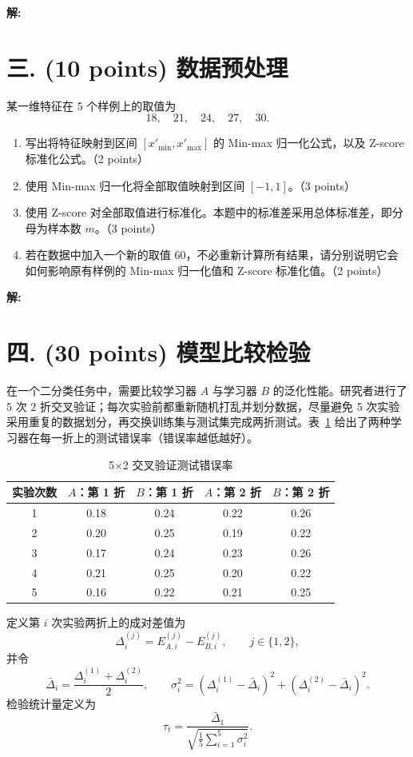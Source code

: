 \documentclass[8pt]{article}
\begin{document}
\textbf{\large 解:}


\clearpage
\section*{三. (10 points) 数据预处理}

某一维特征在 5 个样例上的取值为
\[
18,\quad 21,\quad 24,\quad 27,\quad 30.
\]

\begin{enumerate}[leftmargin=2.2em,itemsep=0.55em]
  \item 写出将特征映射到区间 $[x'_{\min},x'_{\max}]$ 的 Min-max 归一化公式，以及 Z-score 标准化公式。（2 points）
  \item 使用 Min-max 归一化将全部取值映射到区间 $[-1,1]$。（3 points）
  \item 使用 Z-score 对全部取值进行标准化。本题中的标准差采用总体标准差，即分母为样本数 $m$。（3 points）
  \item 若在数据中加入一个新的取值 60，不必重新计算所有结果，请分别说明它会如何影响原有样例的 Min-max 归一化值和 Z-score 标准化值。（2 points）
\end{enumerate}

\textbf{\large 解:}

\clearpage
\section*{四. (30 points) 模型比较检验}

在一个二分类任务中，需要比较学习器 $A$ 与学习器 $B$ 的泛化性能。研究者进行了 5 次 2 折交叉验证；每次实验前都重新随机打乱并划分数据，尽量避免 5 次实验采用重复的数据划分，再交换训练集与测试集完成两折测试。表~\ref{tab:5x2cv} 给出了两种学习器在每一折上的测试错误率（错误率越低越好）。

\begin{table}[H]
\centering
\begin{tabular}{ccccc}
\toprule
\textbf{实验次数} & $A$：第 1 折 & $B$：第 1 折 & $A$：第 2 折 & $B$：第 2 折 \\
\midrule
1 & 0.18 & 0.24 & 0.22 & 0.26 \\
2 & 0.20 & 0.25 & 0.19 & 0.22 \\
3 & 0.17 & 0.24 & 0.23 & 0.26 \\
4 & 0.21 & 0.25 & 0.20 & 0.22 \\
5 & 0.16 & 0.22 & 0.21 & 0.25 \\
\bottomrule
\end{tabular}
\caption{5×2 交叉验证测试错误率}
\label{tab:5x2cv}
\end{table}
定义第 $i$ 次实验两折上的成对差值为
\[
\Delta_i^{(j)}=E_{A,i}^{(j)}-E_{B,i}^{(j)},\qquad j\in\{1,2\},
\]
并令
\[
\bar{\Delta}_i=\frac{\Delta_i^{(1)}+\Delta_i^{(2)}}{2},\qquad
\sigma_i^2=\left(\Delta_i^{(1)}-\bar{\Delta}_i\right)^2+
\left(\Delta_i^{(2)}-\bar{\Delta}_i\right)^2.
\]
检验统计量定义为
\[
\tau_t=\frac{\bar{\Delta}_1}{\sqrt{\frac{1}{5}\sum_{i=1}^{5}\sigma_i^2}}.
\]
\end{document}
